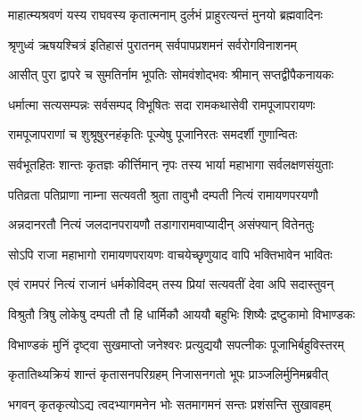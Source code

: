  

\twolineshloka
{माहात्म्यश्रवणं यस्य राघवस्य कृतात्मनाम्}
{दुर्लभं प्राहुरत्यन्तं मुनयो ब्रह्मवादिनः}%

 

\twolineshloka
{श्रृणुध्वं ऋषयश्चित्रं इतिहासं पुरातनम्}
{सर्वपापप्रशमनं सर्वरोगविनाशनम्}%

 

\twolineshloka
{आसीत् पुरा द्वापरे च सुमतिर्नाम भूपतिः}
{सोमवंशोद्‌भवः श्रीमान् सप्तद्वीपैकनायकः}%

 

\twolineshloka
{धर्मात्मा सत्यसम्पन्नः सर्वसम्पद् विभूषितः}
{सदा रामकथासेवी रामपूजापरायणः}%

 

\twolineshloka
{रामपूजापराणां च शुश्रूषुरनहंकृतिः}
{पूज्येषु पूजानिरतः समदर्शी गुणान्वितः}%

 

\twolineshloka
{सर्वभूतहितः शान्तः कृतज्ञः कीर्त्तिमान् नृपः}
{तस्य भार्या महाभागा सर्वलक्षणसंयुताः}%

 

\twolineshloka
{पतिव्रता पतिप्राणा नाम्ना सत्यवती श्रुता}
{तावुभौ दम्पती नित्यं रामायणपरयणौ}%

 

\twolineshloka
{अन्नदानरतौ नित्यं जलदानपरायणौ}
{तडागारामवाप्यादीन् असंफ्यान् वितेनतुः}%

 

\twolineshloka
{सोऽपि राजा महाभागो रामायणपरायणः}
{वाचयेच्छृणुयाद वापि भक्तिभावेन भावितः}%

 

\twolineshloka
{एवं रामपरं नित्यं राजानं धर्मकोविदम्}
{तस्य प्रियां सत्यवतीं देवा अपि सदास्तुवन्}%

 

\twolineshloka
{विश्रुतौ त्रिषु लोकेषु दम्पती तौ हि धार्मिकौ}
{आययौ बहुभिः शिष्यैः द्रष्टुकामो विभाण्डकः}%

 

\twolineshloka
{विभाण्डकं मुनिं दृष्ट्वा सुखमाप्तो जनेश्वरः}
{प्रत्युद्ययौ सपत्‍नीकः पूजाभिर्बहुविस्तरम्}%

 

\twolineshloka
{कृतातिथ्यक्रियं शान्तं कृतासनपरिग्रहम्}
{निजासनगतो भूपः प्राञ्जलिर्मुनिमब्रवीत्}%

 


\twolineshloka
{भगवन् कृतकृत्योऽद्य त्वदभ्यागमनेन भोः}
{सतमागमनं सन्तः प्रशंसन्ति सुखावहम्}%

